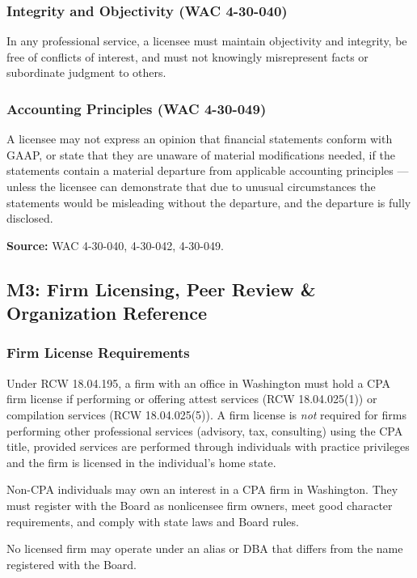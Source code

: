 \documentclass[11pt,letterpaper]{article}
\begin{document}
\subsubsection{Integrity and Objectivity (WAC 4-30-040)}

In any professional service, a licensee must maintain objectivity and integrity, be free of conflicts of interest, and must not knowingly misrepresent facts or subordinate judgment to others.

\subsubsection{Accounting Principles (WAC 4-30-049)}

A licensee may not express an opinion that financial statements conform with GAAP, or state that they are unaware of material modifications needed, if the statements contain a material departure from applicable accounting principles --- unless the licensee can demonstrate that due to unusual circumstances the statements would be misleading without the departure, and the departure is fully disclosed.

\textbf{Source:} WAC 4-30-040, 4-30-042, 4-30-049.

\subsection{M3: Firm Licensing, Peer Review \& Organization Reference}

\subsubsection{Firm License Requirements}

Under RCW 18.04.195, a firm with an office in Washington must hold a CPA firm license if performing or offering attest services (RCW 18.04.025(1)) or compilation services (RCW 18.04.025(5)). A firm license is \emph{not} required for firms performing other professional services (advisory, tax, consulting) using the CPA title, provided services are performed through individuals with practice privileges and the firm is licensed in the individual's home state.

Non-CPA individuals may own an interest in a CPA firm in Washington. They must register with the Board as nonlicensee firm owners, meet good character requirements, and comply with state laws and Board rules.

No licensed firm may operate under an alias or DBA that differs from the name registered with the Board.
\end{document}

